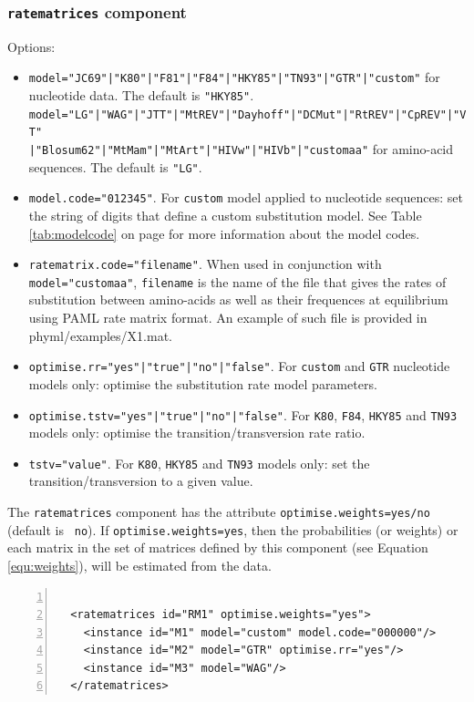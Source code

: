 \documentclass[a4paper,12pt]{article}
\newcommand{\x}[1]{\texttt{#1}}
\begin{document}
\subsubsection{{\tt ratematrices} component}\label{sec:xmlratematrices}
Options:
\begin{itemize}
\item \x{model="JC69"|"K80"|"F81"|"F84"|"HKY85"|"TN93"|"GTR"|"custom"} for nucleotide data. The default is \x{"HKY85"}.\\
\x{model="LG"|"WAG"|"JTT"|"MtREV"|"Dayhoff"|"DCMut"|"RtREV"|"CpREV"|"VT"}\\\x{|"Blosum62"|"MtMam"|"MtArt"|"HIVw"|"HIVb"|"customaa"}
for amino-acid sequences. The default is \x{"LG"}.
\item \x{model.code="012345"}. For \x{custom} model applied to nucleotide sequences: set the
  string of digits that define a custom substitution model. See Table \ref{tab:modelcode} on page
  \pageref{tab:modelcode} for more
  information about the model codes.
\item \x{ratematrix.code="filename"}. When used in conjunction with \x{model="customaa"},
  \x{filename} is the name of the file that gives the rates of substitution between amino-acids as
  well as their frequences at equilibrium using PAML rate matrix format. An example of such file is
  provided in {phyml/examples/X1.mat}.
\item \x{optimise.rr="yes"|"true"|"no"|"false"}. For \x{custom} and \x{GTR} nucleotide models only:
  optimise the substitution rate model parameters.
\item \x{optimise.tstv="yes"|"true"|"no"|"false"}. For \x{K80}, \x{F84}, \x{HKY85} and \x{TN93}
  models only: optimise the transition/transversion rate ratio.
\item \x{tstv="value"}. For \x{K80}, \x{HKY85} and \x{TN93} models only: set the transition/transversion to a
  given value.
\end{itemize}

The {\tt ratematrices} component has the attribute {\tt optimise.weights=yes/no} (default is {\tt
  no}). If {\tt optimise.weights=yes}, then the probabilities (or weights) or each matrix in the
set of matrices defined by this component (see Equation \ref{equ:weights}), will be estimated from the data.

\vspace{0.2cm}
\begin{Verbatim}[frame=single, label=Example of `ratematrices' component, samepage=true,
  baselinestretch=0.5, fontsize=\small, numbers=left]

  <ratematrices id="RM1" optimise.weights="yes">
    <instance id="M1" model="custom" model.code="000000"/>
    <instance id="M2" model="GTR" optimise.rr="yes"/>
    <instance id="M3" model="WAG"/>
  </ratematrices>

\end{Verbatim}
\end{document}
